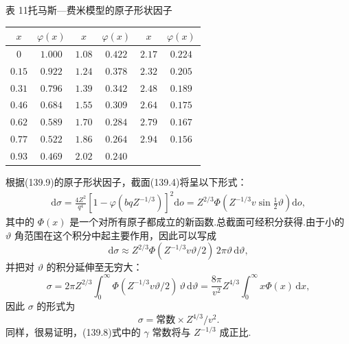 \begin{center}
{\heiti 表 11}\quad 托马斯—费米模型的原子形状因子
\end{center}

\begin{center}
\begin{tabular}{|c|c||c|c||c|c|}
  \hline
  $x$ & $\varphi(x)$ & $x$ & $\varphi(x)$ & $x$ & $\varphi(x)$\\
  \hline
  $0$ & $1.000$ & $1.08$ & $0.422$ & $2.17$ & $0.224$\\
  $0.15$ & $0.922$ & $1.24$ & $0.378$ & $2.32$ & $0.205$\\
  $0.31$ & $0.796$ & $1.39$ & $0.342$ & $2.48$ & $0.189$\\
  $0.46$ & $0.684$ & $1.55$ & $0.309$ & $2.64$ & $0.175$\\
  $0.62$ & $0.589$ & $1.70$ & $0.284$ & $2.79$ & $0.167$\\
  $0.77$ & $0.522$ & $1.86$ & $0.264$ & $2.94$ & $0.156$\\
  $0.93$ & $0.469$ & $2.02$ & $0.240$ & & \\
  \hline
\end{tabular}
\end{center}

根据(139.9)的原子形状因子，截面(139.4)将呈以下形式：
\begin{equation}
\begin{aligned}
  \mathrm{d}\sigma
  =\frac{4Z^2}{q^4}\left[1-\varphi(bqZ^{-1/3})\right]^2\mathrm{d}o
  =Z^{2/3}\varPhi\left(Z^{-1/3}v\sin\frac{1}{2}\vartheta\right)
  \mathrm{d}o,
\end{aligned}
\end{equation}
其中的 $\varPhi(x)$ 是一个对所有原子都成立的新函数.总截面可经积分获得.由于小的 $\vartheta$ 角范围在这个积分中起主要作用，因此可以写成
\begin{equation*}
  \mathrm{d}\sigma\approx Z^{2/3}
  \varPhi(Z^{-1/3}v\vartheta/2)\,2\pi\vartheta\,\mathrm{d}\vartheta,
\end{equation*}
并把对 $\vartheta$ 的积分延伸至无穷大：
\begin{equation*}
  \sigma=2\pi Z^{2/3}\int_0^{\infty}
  \varPhi(Z^{-1/3}v\vartheta/2)\,\vartheta\,\mathrm{d}\vartheta
  =\frac{8\pi}{v^2}Z^{4/3}\int_0^{\infty}x\varPhi(x)\,\mathrm{d}x,
\end{equation*}
因此 $\sigma$ 的形式为
\begin{equation}
  \sigma=\text{常数}\times Z^{4/3}/v^2.
\end{equation}
同样，很易证明，(139.8)式中的 $\gamma$ 常数将与 $Z^{-1/3}$ 成正比.


